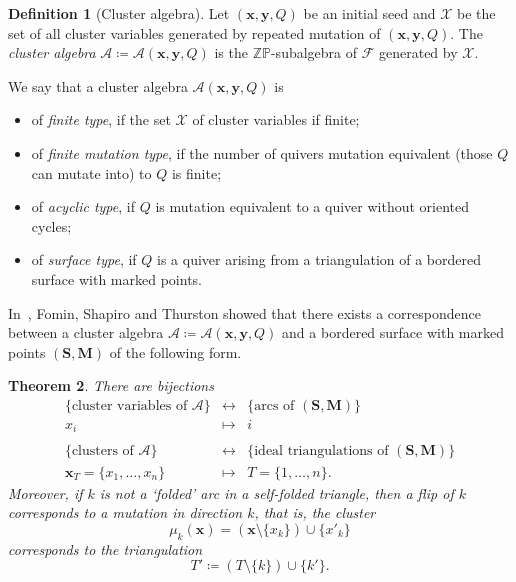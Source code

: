 \documentclass[a4paper,oneside,svgnames]{amsart}
\theoremstyle{plain}
\newtheorem{theorem}{Theorem}[section]
\theoremstyle{definition}
\newtheorem{definition}[theorem]{Definition}
\begin{document}
 \begin{definition}[Cluster algebra]
  Let $(\mathbf{x},\mathbf{y},Q)$ be an initial seed and $\mathcal{X}$ be the
  set of all cluster variables generated by repeated mutation of
  $(\mathbf{x},\mathbf{y},Q)$. The \emph{cluster algebra} $\mathcal{A} \coloneqq
  \mathcal{A}(\mathbf{x},\mathbf{y},Q)$ is the $\mathbb{Z}\mathbb{P}$-subalgebra
  of $\mathcal{F}$ generated by $\mathcal{X}$.

  We say that a cluster algebra $\mathcal{A}(\mathbf{x},\mathbf{y},Q)$ is
  \begin{itemize}
   \item of \emph{finite type}, if the set $\mathcal{X}$ of cluster variables if
    finite;
   \item of \emph{finite mutation type}, if the number of quivers mutation
    equivalent (those $Q$ can mutate into) to $Q$ is finite;
   \item of \emph{acyclic type}, if $Q$ is mutation equivalent to a quiver
    without oriented cycles;
   \item of \emph{surface type}, if $Q$ is a quiver arising from a triangulation
    of a bordered surface with marked points.
  \end{itemize}
 \end{definition}

 In~\cite{fst}, Fomin, Shapiro and Thurston showed that there exists a
 correspondence between a cluster algebra $\mathcal{A} \coloneqq
 \mathcal{A}(\mathbf{x},\mathbf{y},Q)$ and a bordered surface with marked points
 $(\mathbf{S},\mathbf{M})$ of the following form.

 \begin{theorem}
  There are bijections
  \begin{equation*}
   \begin{array}{ccc}
    \{\text{cluster variables of }\mathcal{A}\} &\longleftrightarrow &
    \{\text{arcs of }(\mathbf{S},\mathbf{M})\}\\
    x_i &\longmapsto & i\\
                                       &&\\
    \{\text{clusters of }\mathcal{A}\} &\longleftrightarrow & \{\text{ideal
    triangulations of }(\mathbf{S},\mathbf{M})\}\\
      \mathbf{x}_T = \{x_1,\ldots,x_n\} & \longmapsto & T = \{1,\ldots,n\}.
   \end{array}
  \end{equation*}
  Moreover, if $k$ is not a `folded' arc in a self-folded triangle, then a flip
  of $k$ corresponds to a mutation in direction $k$, that is, the cluster
  \[
   \mu_k(\mathbf{x}) = (\mathbf{x} \setminus \{x_k\}) \cup \{x'_k\}
  \]
  corresponds to the triangulation
  \[
   T' \coloneqq (T \setminus \{k\}) \cup \{k'\}.
  \]
 \end{theorem}
\end{document}
